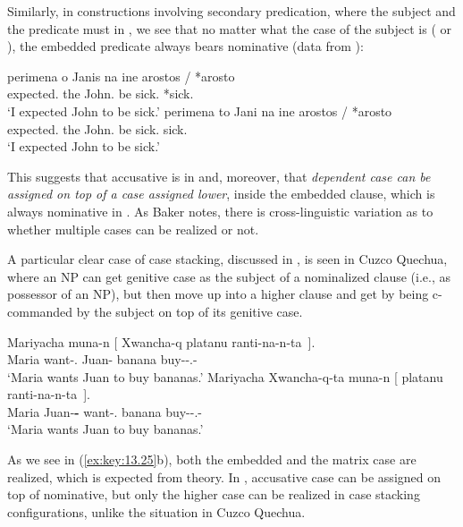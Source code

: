 \documentclass[output=paper]{langsci/langscibook}
\begin{document}
Similarly, in constructions involving secondary predication, where the subject
and the predicate must  in , we see that no matter what the case of
the subject is (\Nom{} or \Acc), the embedded predicate always bears nominative
(data from \citealt{KotzPapa2007}):

\ea%
\label{ex:key:13.24} \parencite{KotzPapa2007}
	\ea
	\gll  perimena o Janis na ine arostos / *arosto\\
        expected.\Fsg{} the John.\Nom{} \Sbjv{} be sick.\Nom{} {} \hphantom{*}*sick.\Acc{}\\
	\glt     ‘I expected John to be sick.’
	\ex
	\gll  perimena to Jani na ine arostos / *arosto\\
        expected.\Fsg{} the John.\Acc{} \Sbjv{} be sick.\Nom{} {} \hphantom{*}sick.\Acc{}\\
	\glt     ‘I expected John to be sick.’
    \z
\z

This suggests that accusative is  in  and, moreover, that
\emph{dependent case can be assigned on top of a case assigned lower}, inside
the embedded clause, which is always nominative in .  As Baker notes,
there is cross-linguistic variation as to whether multiple cases can be
realized or not.

A particular clear case of case stacking, discussed in \citet{Baker2015}, is
seen in Cuzco Quechua, where an NP can get genitive case as the subject of a
nominalized clause (i.e., as possessor of an NP), but then move up into a
higher clause and get  by being c-commanded by the subject on
top of its genitive case.

\ea%
\label{ex:key:13.25} \parencite[116]{Baker2015}
	\ea
	\gll  Mariyacha muna-n  [ Xwancha-q platanu ranti-na-n-ta~].\\
        Maria want-\Third.\Sbj{} {} Juan-\textbf{\Gen{}}  banana buy-\Nmlz{}-\Third.\Poss{}-\Acc{}\\
	\glt     ‘Maria wants Juan to buy bananas.’
	\ex
	\gll  Mariyacha  Xwancha-q-ta muna-n [ platanu ranti-na-n-ta~].\\
        Maria    Juan-\textbf{\Gen{}-\Acc{}} want-\Third.\Sbj{} {} banana buy-\Nmlz{}-\Third.\Poss{}-\Acc{}\\
	\glt     ‘Maria wants Juan to buy bananas.’
    \z
\z

As we see in (\ref{ex:key:13.25}b), both the embedded and the matrix case are
realized, which is expected from  theory. In ,
accusative case can be assigned on top of nominative, but
only the higher case can be realized in case stacking configurations, unlike
the situation in Cuzco Quechua.
\end{document}
